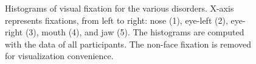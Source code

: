 \documentclass{llncs}
\begin{document}
  \begin{figure}[h]
    \hfill
    \hfill
    \caption{Histograms of visual fixation for the various disorders. X-axis represents fixations, from left to right: nose (1), eye-left (2), eye-right (3), mouth (4), and jaw (5). The histograms are computed with the data of all participants. The non-face fixation is removed for visualization convenience. }
    \label{fig:histo}
    \vspace{-2ex}
  \end{figure}

  
\end{document}
